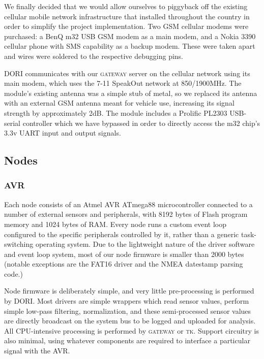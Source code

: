 \documentclass[12pt]{article}
\newcommand{\brand}{}
\begin{document}
    We finally decided that we would allow ourselves to piggyback off the existing cellular mobile network infrastructure that installed throughout the country in order to simplify the project implementation. Two GSM cellular modems were purchased: a \brand{BenQ m32} USB GSM modem as a main modem, and a \brand{Nokia 3390} cellular phone with SMS capability as a backup modem. These were taken apart and wires were soldered to the respective debugging pins.

    DORI communicates with our \textsc{gateway} server on the cellular network using its main modem, which uses the \brand{7-11 SpeakOut} network at 850/1900MHz. The module's existing antenna was a simple stub of metal, so we replaced its antenna with an external GSM antenna meant for vehicle use, increasing its signal strength by approximately 2dB. The module includes a \brand{Prolific PL2303} USB-serial controller which we have bypassed in order to directly access the \brand{m32} chip's 3.3v UART input and output signals\cite{m32}.

    \subsection{Nodes}
        \subsubsection{AVR}
        Each node consists of an \brand{Atmel AVR ATmega88} microcontroller connected to a number of external sensors and peripherals, with 8192 bytes of Flash program memory and 1024 bytes of RAM. Every node runs a custom event loop configured to the specific peripherals controlled by it, rather than a generic task-switching operating system. Due to the lightweight nature of the driver software and event loop system, most of our node firmware is smaller than 2000 bytes (notable exceptions are the FAT16 driver and the NMEA datestamp parsing code.)

        Node firmware is deliberately simple, and very little pre-processing is performed by DORI. Most drivers are simple wrappers which read sensor values, perform simple low-pass filtering, normalization, and these semi-processed sensor values are directly broadcast on the system bus to be logged and uploaded for analysis. All CPU-intensive processing is performed by \textsc{gateway} or \textsc{tk}. Support circuitry is also minimal, using whatever components are required to interface a particular signal with the AVR.
        
\end{document}
